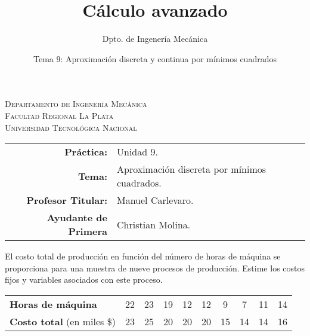 \documentclass[11pt]{article}
\title{Cálculo avanzado}
\author{Dpto. de Ingenería Mecánica}
\date{Tema 9: Aproximación discreta y continua por mínimos cuadrados}
\begin{document}

\begin{center}
\end{center} 

\begin{center}
\vspace{\baselineskip}
\Large{\textsc{Departamento de Ingenería Mecánica}} \\
\textsc{Facultad Regional La Plata} \\
\textsc{Universidad Tecnológica Nacional}
\end{center}


\begin{center}
\begin{tabular}{r l}
    \textbf{Práctica:} & Unidad 9. \\
 \textbf{Tema:} & Aproximación discreta por mínimos cuadrados. \\
 \textbf{Profesor Titular:} & Manuel Carlevaro. \\
 \textbf{Ayudante de Primera} & Christian Molina. \\
\end{tabular}\end{center}
\vspace{1em}

\begin{question} %
El costo total de producción en función del número de horas de máquina se proporciona para una muestra de nueve procesos de producción. Estime los costos fijos y variables asociados con este proceso.

\begin{center}
    \begin{tabular}{lccccccccc}
        \toprule
        \textbf{Horas de máquina} & 22 & 23 & 19 & 12 & 12 & 9 & 7 & 11 & 14 \\
        \textbf{Costo total} (en miles \$) & 23 & 25 & 20 & 20 & 20 & 15 & 14 & 14 & 16 \\
        \bottomrule
    \end{tabular}
\end{center}
\end{question}
\end{document}
